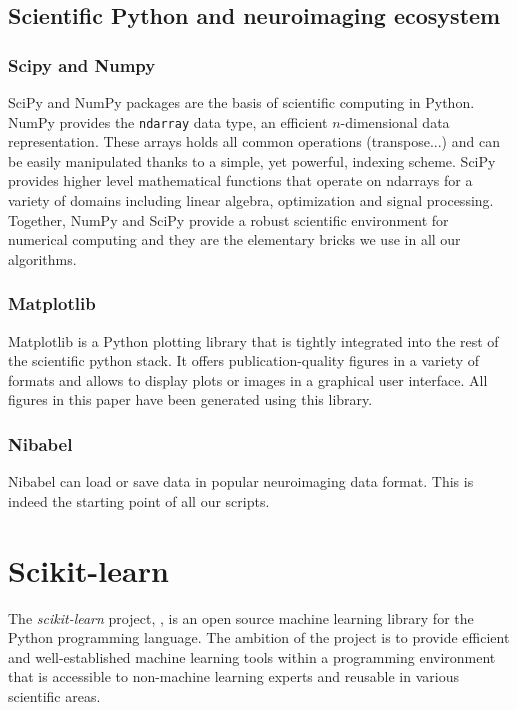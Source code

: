 \documentclass{frontiersSCNS} %
\begin{document}
\subsection{Scientific Python and neuroimaging ecosystem}

\subsubsection{Scipy and Numpy}

SciPy and NumPy packages are the basis of scientific computing in Python.
NumPy provides the \verb!ndarray! data type, an efficient $n$-dimensional data
representation. These arrays holds all common operations (transpose...) and
can be easily manipulated thanks to a simple, yet powerful, indexing scheme.
SciPy provides higher level mathematical functions that operate on ndarrays for
a variety of domains including linear algebra, optimization and signal
processing. Together, NumPy and SciPy provide a robust scientific environment
for numerical computing and they are the elementary bricks we use in all our
algorithms.

\subsubsection{Matplotlib}

Matplotlib is a Python plotting library that is tightly integrated into the
rest of the scientific python stack. It offers publication-quality figures in
a variety of formats and allows to display plots or images in a
graphical user interface. All figures in this paper have been generated using
this library.


\subsubsection{Nibabel}

Nibabel can load or save data in
popular neuroimaging data format. This is indeed the starting point of all
our scripts.

\section{Scikit-learn}
\label{scikitlearn}

The {\em scikit-learn} project, \cite{pedregosa2011}, is an open source machine
learning library for the Python programming language. The ambition of the
project is to provide efficient and well-established machine learning tools within
a programming environment that is accessible to non-machine learning experts
and reusable in various scientific areas.
\end{document}
